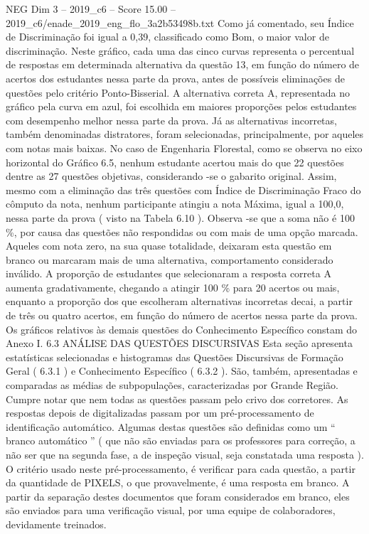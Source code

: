 \begin{textsample}{NEG Dim 3 – 2019\_c6 – Score 15.00 – 2019\_c6/enade\_2019\_eng\_flo\_3a2b53498b.txt}
Como já comentado, seu Índice de Discriminação foi igual a 0,39, classificado como Bom, o maior valor de discriminação.
Neste gráfico, cada uma das cinco curvas representa o percentual de respostas em determinada alternativa da questão 13, em função do número de acertos dos estudantes nessa parte da prova, antes de possíveis eliminações de questões pelo critério Ponto-Bisserial.
A alternativa correta A, representada no gráfico pela curva em azul, foi escolhida em maiores proporções pelos estudantes com desempenho melhor nessa parte da prova.
Já as alternativas incorretas, também denominadas distratores, foram selecionadas, principalmente, por aqueles com notas mais baixas.
No caso de Engenharia Florestal, como se observa no eixo horizontal do Gráfico 6.5, nenhum estudante acertou mais do que 22 questões dentre as 27 questões objetivas, considerando -se o gabarito original.
Assim, mesmo com a eliminação das três questões com Índice de Discriminação Fraco do cômputo da nota, nenhum participante atingiu a nota Máxima, igual a 100,0, nessa parte da prova ( visto na Tabela 6.10 ).
Observa -se que a soma não é 100 \%, por causa das questões não respondidas ou com mais de uma opção marcada.
Aqueles com nota zero, na sua quase totalidade, deixaram esta questão em branco ou marcaram mais de uma alternativa, comportamento considerado inválido.
A proporção de estudantes que selecionaram a resposta correta A aumenta gradativamente, chegando a atingir 100 \% para 20 acertos ou mais, enquanto a proporção dos que escolheram alternativas incorretas decai, a partir de três ou quatro acertos, em função do número de acertos nessa parte da prova.
Os gráficos relativos às demais questões do Conhecimento Específico constam do Anexo I. 6.3 ANÁLISE DAS QUESTÕES DISCURSIVAS Esta seção apresenta estatísticas selecionadas e histogramas das Questões Discursivas de Formação Geral ( 6.3.1 ) e Conhecimento Específico ( 6.3.2 ).
São, também, apresentadas e comparadas as médias de subpopulações, caracterizadas por Grande Região.
Cumpre notar que nem todas as questões passam pelo crivo dos corretores.
As respostas depois de digitalizadas passam por um pré-processamento de identificação automático.
Algumas destas questões são definidas como um “ branco automático ” ( que não são enviadas para os professores para correção, a não ser que na segunda fase, a de inspeção visual, seja constatada uma resposta ).
O critério usado neste pré-processamento, é verificar para cada questão, a partir da quantidade de PIXELS, o que provavelmente, é uma resposta em branco.
A partir da separação destes documentos que foram considerados em branco, eles são enviados para uma verificação visual, por uma equipe de colaboradores, devidamente treinados.

\end{textsample}
